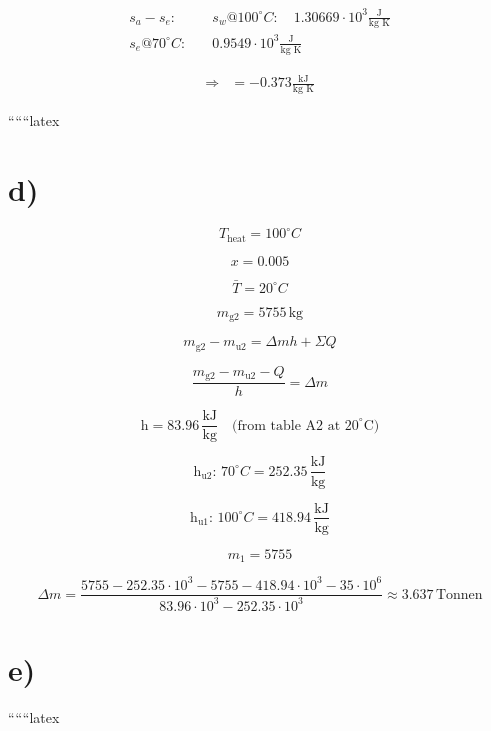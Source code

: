 \begin{align*}
s_a - s_e: & \quad s_w @ 100^\circ C: \quad 1.30669 \cdot 10^3 \frac{\text{J}}{\text{kg K}} \\
s_e @ 70^\circ C: & \quad 0.9549 \cdot 10^3 \frac{\text{J}}{\text{kg K}}
\end{align*}

\begin{align*}
\Rightarrow &= -0.373 \frac{\text{kJ}}{\text{kg K}}
\end{align*}

``````latex

\section*{d)}

\[
T_{\text{heat}} = 100^\circ C
\]

\[
x = 0.005
\]

\[
\bar{T} = 20^\circ C
\]

\[
m_{\text{g2}} = 5755 \, \text{kg}
\]

\[
m_{\text{g2}} - m_{\text{u2}} = \Delta m h + \Sigma Q
\]

\[
\frac{m_{\text{g2}} - m_{\text{u2}} - Q}{h} = \Delta m
\]

\[
\text{h} = 83.96 \, \frac{\text{kJ}}{\text{kg}} \quad \text{(from table A2 at 20}^\circ \text{C)}
\]

\[
\text{h}_{\text{u2}}: \, 70^\circ C = 252.35 \, \frac{\text{kJ}}{\text{kg}}
\]

\[
\text{h}_{\text{u1}}: \, 100^\circ C = 418.94 \, \frac{\text{kJ}}{\text{kg}}
\]

\[
m_1 = 5755
\]

\[
\Delta m = \frac{5755 - 252.35 \cdot 10^3 - 5755 - 418.94 \cdot 10^3 - 35 \cdot 10^6}{83.96 \cdot 10^3 - 252.35 \cdot 10^3} \approx 3.637 \, \text{Tonnen}
\]

\section*{e)}

``````latex


